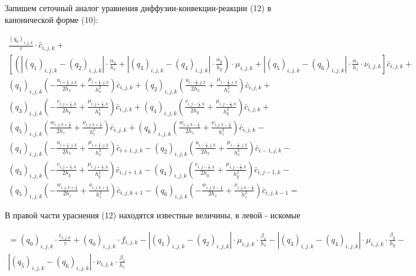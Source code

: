 \documentclass[12pt]{article}
\begin{document}
Запишем сеточный аналог уравнения диффузии-конвекции-реакции (12) в канонической форме (10): 

\begin{multline*}
\frac{(q_0)_{i,j,k}}{\tau}\cdot \hat{c}_{i,j,k} + \\
 \left[ \left( | (q_1)_{i,j,k} - (q_2)_{i,j,k}| \cdot \frac{\alpha_x}{h_x} + | (q_3)_{i,j,k} - (q_4)_{i,j,k}| \cdot \frac{\alpha_y}{h_y} \right) \cdot \mu_{i,j,k} + |(q_5)_{i,j,k} - (q_6)_{i,j,k}| \cdot \frac{\alpha_z}{h_z}\cdot \nu_{i,j,k} \right] \bar{c}_{i,j,k} + \\
(q_1)_{i,j,k} \left( -\frac{u_{i+\frac{1}{2},j,k}}{2h_x}  + \frac{\mu_{i+\frac{1}{2},j,k}}{h_x^2} \right) \bar{c}_{i,j,k} + 
(q_2)_{i,j,k} \left( \frac{u_{i-\frac{1}{2},j,k}}{2h_x}  + \frac{\mu_{i-\frac{1}{2},j,k}}{h_x^2} \right) \bar{c}_{i,j,k} +\\
(q_3)_{i,j,k} \left( -\frac{v_{i,j+\frac{1}{2},k}}{2h_y}  + \frac{\mu_{i,j+\frac{1}{2},k}}{h_y^2} \right) \bar{c}_{i,j,k} 
+ (q_4)_{i,j,k} \left( \frac{v_{i,j-\frac{1}{2},k}}{2h_y}  + \frac{\mu_{i,j-\frac{1}{2},k}}{h_y^2} \right) \bar{c}_{i,j,k} +\\
(q_5)_{i,j,k} \left( \frac{w_{i,j,k+\frac{1}{2}}}{2h_z}  + \frac{\nu_{i,j,k+\frac{1}{2}}}{h_z^2} \right) \bar{c}_{i,j,k} +
(q_6)_{i,j,k} \left( \frac{w_{i,j,k-\frac{1}{2}}}{2h_z}  + \frac{\nu_{i,j,k-\frac{1}{2}}}{h_z^2} \right) \bar{c}_{i,j,k} - \\
(q_1)_{i,j,k} \left( -\frac{u_{i+\frac{1}{2},j,k}}{2h_x}  + \frac{\mu_{i+\frac{1}{2},j,k}}{h_x^2} \right) \bar{c}_{i+1,j,k} -
(q_2)_{i,j,k} \left( \frac{u_{i-\frac{1}{2},j,k}}{2h_x}  + \frac{\mu_{i-\frac{1}{2},j,k}}{h_x^2} \right) \bar{c}_{i-1,j,k} - \\
(q_3)_{i,j,k} \left( -\frac{v_{i,j+\frac{1}{2},k}}{2h_y}  + \frac{\mu_{i,j+\frac{1}{2},k}}{h_y^2} \right) \bar{c}_{i,j+1,k} -
(q_4)_{i,j,k} \left( \frac{v_{i,j-\frac{1}{2},k}}{2h_y}  + \frac{\mu_{i,j-\frac{1}{2},k}}{h_y^2} \right) \bar{c}_{i,j-1,k} - \\
(q_5)_{i,j,k} \left(- \frac{w_{i,j,k+\frac{1}{2}}}{2h_z}  + \frac{\nu_{i,j,k+\frac{1}{2}}}{h_z^2} \right) \bar{c}_{i,j,k+1} -
(q_6)_{i,j,k} \left(- \frac{w_{i,j,k-\frac{1}{2}}}{2h_z}  + \frac{\nu_{i,j,k-\frac{1}{2}}}{h_z^2} \right) \bar{c}_{i,j,k-1} = 
\end{multline*}

В правой части ураснения (12) находятся известные величины, в левой - искомые

\begin{multline}
= (q_0)_{i,j,k} \cdot\frac{\bar c_{i,j,k}}{\tau} + (q_0)_{i,j,k} \cdot f_{i,j,k} - |(q_1)_{i,j,k}-(q_2)_{i,j,k}|\cdot \mu_{i,j,k}\cdot \frac{\beta_x}{h_x} - |(q_3)_{i,j,k}-(q_4)_{i,j,k}|\cdot \mu_{i,j,k}\cdot \frac{\beta_y}{h_y} - \\
|(q_5)_{i,j,k}-(q_6)_{i,j,k}|\cdot \nu_{i,j,k}\cdot \frac{\beta_z}{h_z} 
\end{multline}
\end{document}
